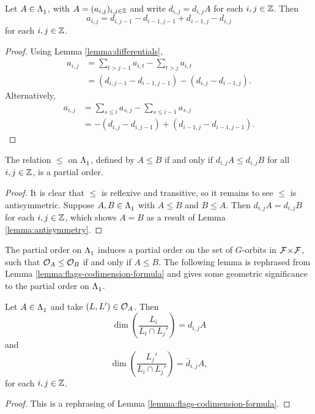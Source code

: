 \documentclass[a4paper, 11pt]{report}
\begin{document}
\begin{lemma}\label{lemma:antisymmetry}
Let $A\in\Lambda_1^{}$, with $A = (a_{i,j})_{i,j\in\mathbb{Z}}$ and write $d_{i,j}=d_{i,j}A$ for each $i,j\in\mathbb{Z}$. Then
\begin{equation*}
a_{i,j} = d_{i,j-1} - d_{i-1,j-1} + d_{i-1,j} - d_{i,j}
\end{equation*}
for each $i,j\in\mathbb{Z}$.
\end{lemma}
\begin{proof}
Using Lemma \ref{lemma:differentials},
\begin{align*}
a_{i,j}
&= \sum_{t>j-1}a_{i,t} - \sum_{t>j}a_{i,t}\\
&= (d_{i,j-1} - d_{i-1,j-1}) - (d_{i,j} - d_{i-1,j}).
\end{align*}
Alternatively,
\begin{align*}
a_{i,j}
&= \sum_{s\le i}a_{s,j} - \sum_{s\le i-1}a_{s,j}\\
&= -(d_{i,j}-d_{i,j-1}) + (d_{i-1,j} - d_{i-1,j-1}).
\end{align*}
\end{proof}

\begin{lemma}\label{lemma:orbit-poset}
The relation $\le$ on $\Lambda_1^{}$, defined by $A\le B$ if and only if $d_{i,j}A\le d_{i,j}B$ for all $i,j\in\mathbb{Z}$, is a partial order.
\end{lemma}

\begin{proof}
It is clear that $\le$ is reflexive and transitive, so it remains to see $\le$ is antisymmetric. Suppose $A,B\in\Lambda_1^{}$ with $A\le B$ and $B\le A$. Then $d_{i,j}A = d_{i,j}B$ for each $i,j\in\mathbb{Z}$, which shows $A=B$ as a result of Lemma \ref{lemma:antisymmetry}.  
\end{proof}

The partial order on $\Lambda_1^{}$ induces a partial order on the set of $G$-orbits in ${\mathcal{F}\!\times\!\mathcal{F}}$, such that $\mathcal{O}_{A}\le \mathcal{O}_{B}$ if and only if $A\le B$. The following lemma is rephrased from Lemma \ref{lemma:flags-codimension-formula} and gives some geometric significance to the partial order on $\Lambda_1^{}$.

\begin{lemma}\label{lemma:codimension-formula-corner-sums}
Let $A\in\Lambda_1^{}$ and take $(L,L')\in\mathcal{O}_{A}$. Then
\begin{equation*}
\dim\left(\frac{L_i}{L_i\cap L_j'}\right) = d_{i,j}{A}
\end{equation*}
and
\begin{equation*}
\dim\left(\frac{L_j'}{L_i\cap L_j'}\right) = \bar{d}_{i,j}{A},
\end{equation*}
for each $i,j\in\mathbb{Z}$.
\end{lemma}
\begin{proof}
This is a rephrasing of Lemma \ref{lemma:flags-codimension-formula}.
\end{proof}
\end{document}
